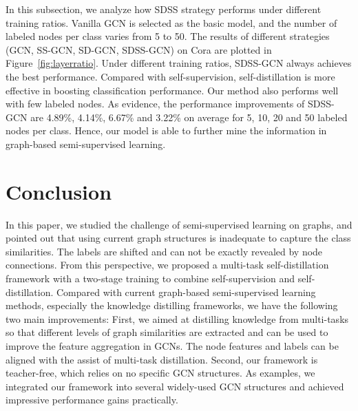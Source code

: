 \documentclass[letterpaper]{article} \usepackage{aaai22} \usepackage{times} \usepackage{helvet} \usepackage{courier} \usepackage[hyphens]{url} \usepackage{graphicx} \urlstyle{rm} \def\UrlFont{\rm} \usepackage{subfigure}
\begin{document}
	In this subsection, we analyze how SDSS strategy performs under different training ratios. Vanilla GCN is selected as the basic model, and the number of labeled nodes per class varies from 5 to 50. The results of different strategies (GCN, SS-GCN, SD-GCN, SDSS-GCN) on Cora are plotted in Figure~\ref{fig:layerratio}. Under different training ratios, SDSS-GCN always achieves the best performance. Compared with self-supervision, self-distillation is more effective in boosting classification performance. Our method also performs well with few labeled nodes. As evidence, the performance improvements of SDSS-GCN are 4.89\%, 4.14\%, 6.67\% and 3.22\% on average for 5, 10, 20 and 50 labeled nodes per class. Hence, our model is able to further mine the information in graph-based semi-supervised learning.
	
	\section{Conclusion}
	In this paper, we studied the challenge of semi-supervised learning on graphs, and pointed out that using current graph structures is inadequate to capture the class similarities. The labels are shifted and can not be exactly revealed by node connections. From this perspective, we proposed a multi-task self-distillation framework with a two-stage training to combine self-supervision and self-distillation. Compared with current graph-based semi-supervised learning methods, especially the knowledge distilling frameworks, we have the following two main improvements: First, we aimed at distilling knowledge from multi-tasks so that different levels of graph similarities are extracted and can be used to improve the feature aggregation in GCNs. The node features and labels can be aligned with the assist of multi-task distillation. Second, our framework is teacher-free, which relies on no specific GCN structures. As examples, we integrated our framework into several widely-used GCN structures and achieved impressive performance gains practically.  
	
	
	
	
\end{document}
